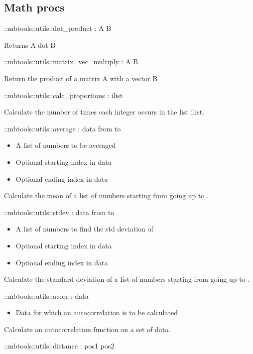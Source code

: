 \subsection{Math procs}

\begin{code}    
  ::mbtools::utils::dot_product  :  A B
\end{code}
Returns A dot B
\begin{code}    
  ::mbtools::utils::matrix_vec_multiply : A B
\end{code}
Return the product of a matrix A with a vector B
\begin{code}    
  ::mbtools::utils::calc_proportions : ilist
\end{code}
Calculate the number of times each integer occurs in the list ilist.
\begin{code}    
  ::mbtools::utils::average : data from to
\end{code}
\begin{itemize}
\item {} A list of numbers to be averaged
\item {} Optional starting index in data
\item {} Optional ending index in data
\end{itemize}
Calculate the mean of a list of numbers starting from  going
up to .
\begin{code}    
  ::mbtools::utils::stdev : data from to
\end{code}
\begin{itemize}
\item {} A list of numbers to find the std deviation of
\item {} Optional starting index in data
\item {} Optional ending index in data
\end{itemize}
Calculate the standard deviation of a list of numbers starting from
 going up to .
\begin{code}    
  ::mbtools::utils::acorr : data
\end{code}
\begin{itemize}
\item {} Data for which an autocorrelation is to be calculated
\end{itemize}
Calculate an autocorrelation function on a set of data.
\begin{code}    
  ::mbtools::utils::distance : pos1 pos2
\end{code}
